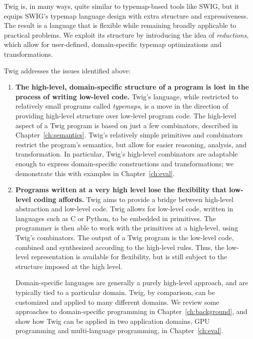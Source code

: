 Twig is, in many ways, quite similar to typemap-based tools like
SWIG, but it equips SWIG's typemap language design with extra
structure and expressiveness. The result is a language that is
flexible while remaining broadly applicable to practical problems.
We exploit its structure by introducing the idea of
\emph{reductions}, which allow for user-defined, domain-specific
typemap optimizations and transformations.

Twig addresses the issues identified above:

\begin{enumerate}

\item\textbf{The high-level, domain-specific structure of a
program is lost in the process of writing low-level code.} Twig's
language, while restricted to relatively small programs called
\emph{typemaps}, is a move in the direction of providing
high-level structure over low-level program code. The high-level
aspect of a Twig program is based on just a few combinators,
described in Chapter~\ref{ch:semantics}. Twig's relatively simple
primitives and combinators restrict the program's semantics, but
allow for easier reasoning, analysis, and transformation. In
particular, Twig's high-level combinators are adaptable enough to
express domain-specific constructions and transformations; we
demonstrate this with examples in Chapter~\ref{ch:eval}.


\item\textbf{Programs written at a very high level lose the
flexibility that low-level coding affords.} Twig aims to provide a
bridge between high-level abstraction and low-level code. Twig
allows for low-level code, written in languages such as C or
Python, to be embedded in primitives. The programmer is then able
to work with the primitives at a high-level, using Twig's
combinators. The output of a Twig program is the low-level code,
combined and synthesized according to the high-level rules. Thus,
the low-level representation is available for flexibility, but is
still subject to the structure imposed at the high level.

Domain-specific languages are generally a purely high-level
approach, and are typically tied to a particular domain. Twig, by
comparison, can be customized and applied to many different
domains. We review some approaches to domain-specific programming
in Chapter~\ref{ch:background}, and show how Twig can be applied
in two application domains, GPU programming and multi-language
programming, in Chapter~\ref{ch:eval}.


\end{enumerate}
